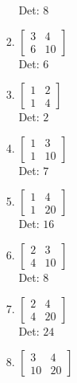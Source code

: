 \documentclass[12pt]{article}
\begin{document}
\begin{enumerate}
\begin{enumerate}
\begin{enumerate}
Det: $8$\\


\item $\displaystyle \left[\begin{matrix}3 & 4\\6 & 10\end{matrix}\right]$\\

Det: $6$\\


\item $\displaystyle \left[\begin{matrix}1 & 2\\1 & 4\end{matrix}\right]$\\

Det: $2$\\


\item $\displaystyle \left[\begin{matrix}1 & 3\\1 & 10\end{matrix}\right]$\\

Det: $7$\\


\item $\displaystyle \left[\begin{matrix}1 & 4\\1 & 20\end{matrix}\right]$\\

Det: $16$\\


\item $\displaystyle \left[\begin{matrix}2 & 3\\4 & 10\end{matrix}\right]$\\

Det: $8$\\


\item $\displaystyle \left[\begin{matrix}2 & 4\\4 & 20\end{matrix}\right]$\\

Det: $24$\\


\item $\displaystyle \left[\begin{matrix}3 & 4\\10 & 20\end{matrix}\right]$\\


\end{enumerate}
\end{enumerate}
\end{enumerate}
\end{document}
